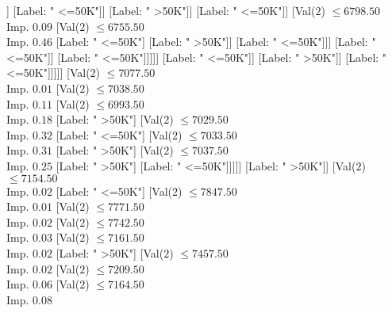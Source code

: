 \documentclass[margin=10pt]{standalone}
\begin{document}
\begin{forest}
																																[Val($2$) $ \leq 6674.50$ \\ Imp. $0.92$
																																	[Label: " <=50K"]
																																	[Label: " >50K"]]
																																[Label: " <=50K"]]
																															[Label: " >50K"]]
																														[Label: " <=50K"]]
																													[Val($2$) $ \leq 6798.50$ \\ Imp. $0.09$
																														[Val($2$) $ \leq 6755.50$ \\ Imp. $0.46$
																															[Label: " <=50K"]
																															[Label: " >50K"]]
																														[Label: " <=50K"]]]
																												[Label: " <=50K"]]
																											[Label: " <=50K"]]]]]
																							[Label: " <=50K"]]
																						[Label: " >50K"]]
																					[Label: " <=50K"]]]]]
																	[Val($2$) $ \leq 7077.50$ \\ Imp. $0.01$
																		[Val($2$) $ \leq 7038.50$ \\ Imp. $0.11$
																			[Val($2$) $ \leq 6993.50$ \\ Imp. $0.18$
																				[Label: " >50K"]
																				[Val($2$) $ \leq 7029.50$ \\ Imp. $0.32$
																					[Label: " <=50K"]
																					[Val($2$) $ \leq 7033.50$ \\ Imp. $0.31$
																						[Label: " >50K"]
																						[Val($2$) $ \leq 7037.50$ \\ Imp. $0.25$
																							[Label: " >50K"]
																							[Label: " <=50K"]]]]]
																			[Label: " >50K"]]
																		[Val($2$) $ \leq 7154.50$ \\ Imp. $0.02$
																			[Label: " <=50K"]
																			[Val($2$) $ \leq 7847.50$ \\ Imp. $0.01$
																				[Val($2$) $ \leq 7771.50$ \\ Imp. $0.02$
																					[Val($2$) $ \leq 7742.50$ \\ Imp. $0.03$
																						[Val($2$) $ \leq 7161.50$ \\ Imp. $0.02$
																							[Label: " >50K"]
																							[Val($2$) $ \leq 7457.50$ \\ Imp. $0.02$
																								[Val($2$) $ \leq 7209.50$ \\ Imp. $0.06$
																									[Val($2$) $ \leq 7164.50$ \\ Imp. $0.08$

\end{forest}
\end{document}
